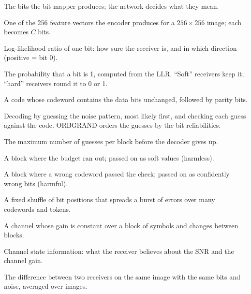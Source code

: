 \documentclass{article}
\begin{document}
\begin{description}[style=nextline]
\item[Semantic bits] The bits the bit mapper produces; the network decides what they mean.
\item[Token] One of the 256 feature vectors the encoder produces for a $256\times256$ image; each becomes $C$ bits.
\item[LLR] Log-likelihood ratio of one bit: how sure the receiver is, and in which direction (positive = bit 0).
\item[Soft value / $P(1)$] The probability that a bit is 1, computed from the LLR. ``Soft'' receivers keep it; ``hard'' receivers round it to 0 or 1.
\item[Systematic code] A code whose codeword contains the data bits unchanged, followed by parity bits.
\item[GRAND / ORBGRAND] Decoding by guessing the noise pattern, most likely first, and checking each guess against the code. ORBGRAND orders the guesses by the bit reliabilities.
\item[Guess budget] The maximum number of guesses per block before the decoder gives up.
\item[Abandoned block] A block where the budget ran out; passed on as soft values (harmless).
\item[Miscorrected block] A block where a wrong codeword passed the check; passed on as confidently wrong bits (harmful).
\item[Interleaver] A fixed shuffle of bit positions that spreads a burst of errors over many codewords and tokens.
\item[Block fading] A channel whose gain is constant over a block of symbols and changes between blocks.
\item[CSI] Channel state information: what the receiver believes about the SNR and the channel gain.
\item[Paired difference] The difference between two receivers on the same image with the same bits and noise, averaged over images.
\end{description}
\end{document}
